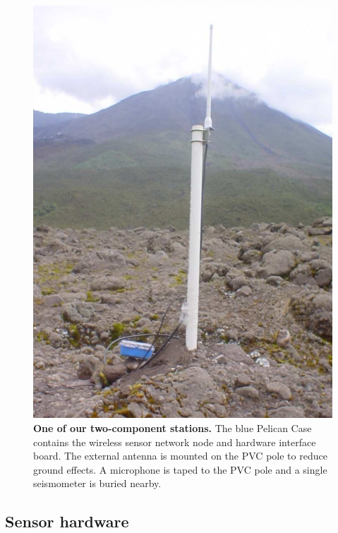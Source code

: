 \begin{figure}[t]
\begin{center}
\includegraphics[width=0.7\hsize]{./3-evaluation/figs/Node-212-5}
\end{center}
\caption{\textbf{One of our two-component stations.} The blue Pelican
Case contains the wireless sensor network node and hardware interface board.
The external antenna is mounted on the PVC pole to reduce ground effects.
A microphone is taped to the PVC pole and a single seismometer is buried
nearby.}
\label{includegraphics-fig-station2}
\end{figure}


\subsection{Sensor hardware}
\label{evaluation-sec-hardware}

